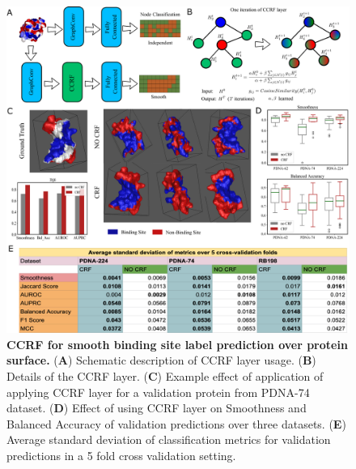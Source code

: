 \begin{center}
\begin{figure}[!htp]
                \includegraphics[width=\textwidth]{crf_figs/demo_crf_fig.png}
        \caption[CCRF for smooth binding site label prediction over protein surface.]{\textbf{CCRF
        for smooth binding site label prediction over protein surface.} ({\bf A}) Schematic
        description of CCRF layer usage. ({\bf B}) Details of the CCRF layer. ({\bf C}) Example
        effect of application of applying CCRF layer for a validation protein from PDNA-74 dataset.
        ({\bf D}) Effect of using CCRF layer on Smoothness and Balanced Accuracy of validation
        predictions over three datasets. ({\bf E}) Average standard deviation of classification
        metrics for validation predictions in a 5 fold cross validation setting.}
        \label{fig:ccrf} \end{figure} \end{center}

